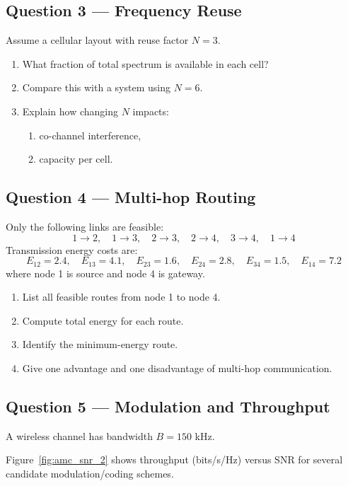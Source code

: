 \documentclass[11pt,a4paper]{article}
\begin{document}
\subsection*{Question 3 --- Frequency Reuse}
Assume a cellular layout with reuse factor $N=3$.

\begin{enumerate}[label=\alph*)]
    \item What fraction of total spectrum is available in each cell?
    \item Compare this with a system using $N=6$.
    \item Explain how changing $N$ impacts:
    \begin{enumerate}[label=\roman*)]
        \item co-channel interference,
        \item capacity per cell.
    \end{enumerate}
\end{enumerate}

\subsection*{Question 4 --- Multi-hop Routing}
Only the following links are feasible:
\[
1 \rightarrow 2,\quad 1 \rightarrow 3,\quad 2 \rightarrow 3,\quad 2 \rightarrow 4,\quad 3 \rightarrow 4,\quad 1 \rightarrow 4
\]
Transmission energy costs are:
\[
E_{12}=2.4,\quad E_{13}=4.1,\quad E_{23}=1.6,\quad E_{24}=2.8,\quad E_{34}=1.5,\quad E_{14}=7.2
\]
where node 1 is source and node 4 is gateway.

\begin{enumerate}[label=\alph*)]
    \item List all feasible routes from node 1 to node 4.
    \item Compute total energy for each route.
    \item Identify the minimum-energy route.
    \item Give one advantage and one disadvantage of multi-hop communication.
\end{enumerate}

\subsection*{Question 5 --- Modulation and Throughput}
A wireless channel has bandwidth $B = 150$ kHz.

Figure~\ref{fig:amc_snr_2} shows throughput (bits/s/Hz) versus SNR for several candidate modulation/coding schemes.

\FloatBarrier
\end{document}
